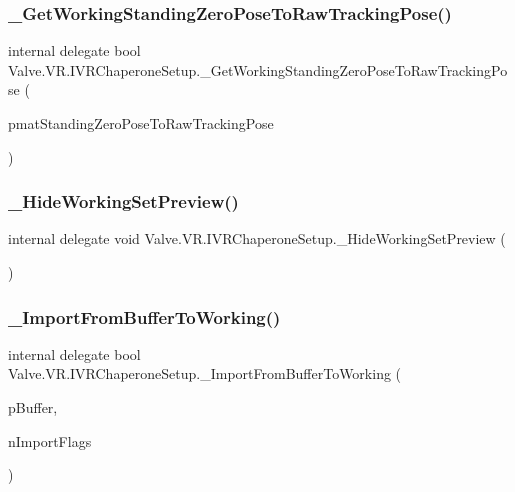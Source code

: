 \subsubsection{\texorpdfstring{\_GetWorkingStandingZeroPoseToRawTrackingPose()}{\_GetWorkingStandingZeroPoseToRawTrackingPose()}}
{\footnotesize\ttfamily internal delegate bool Valve.\+V\+R.\+I\+V\+R\+Chaperone\+Setup.\+\_\+\+Get\+Working\+Standing\+Zero\+Pose\+To\+Raw\+Tracking\+Pose (\begin{DoxyParamCaption}\item[{ref \mbox{\hyperlink{struct_valve_1_1_v_r_1_1_hmd_matrix34__t}{Hmd\+Matrix34\+\_\+t}}}]{pmat\+Standing\+Zero\+Pose\+To\+Raw\+Tracking\+Pose }\end{DoxyParamCaption})}

\mbox{\label{struct_valve_1_1_v_r_1_1_i_v_r_chaperone_setup_a403f94b7d21f3dbf8c27c3de8b346bce}} 
\subsubsection{\texorpdfstring{\_HideWorkingSetPreview()}{\_HideWorkingSetPreview()}}
{\footnotesize\ttfamily internal delegate void Valve.\+V\+R.\+I\+V\+R\+Chaperone\+Setup.\+\_\+\+Hide\+Working\+Set\+Preview (\begin{DoxyParamCaption}{ }\end{DoxyParamCaption})}

\mbox{\label{struct_valve_1_1_v_r_1_1_i_v_r_chaperone_setup_a32c372407593bf70f257cbd766b9935c}} 
\subsubsection{\texorpdfstring{\_ImportFromBufferToWorking()}{\_ImportFromBufferToWorking()}}
{\footnotesize\ttfamily internal delegate bool Valve.\+V\+R.\+I\+V\+R\+Chaperone\+Setup.\+\_\+\+Import\+From\+Buffer\+To\+Working (\begin{DoxyParamCaption}\item[{string}]{p\+Buffer,  }\item[{uint}]{n\+Import\+Flags }\end{DoxyParamCaption})}

